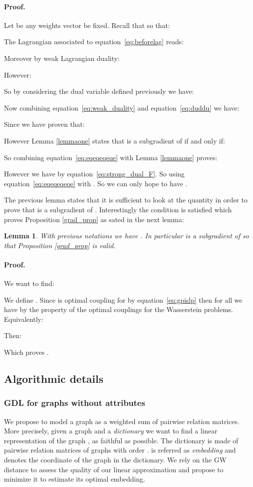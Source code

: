\documentclass{article}
\def\eqref#1{equation~\ref{#1}}
\newtheorem{lemma}{Lemma}
\begin{document}
	\paragraph{Proof.}
	Let  be any weights vector be fixed. Recall that  so that:
	
	The Lagrangian associated to \eqref{eq:beforelag} reads:
	
	Moreover by weak Lagrangian duality:
	
	However: 
	
	So by considering the dual variable  defined previously we have:
	
	Now combining \eqref{eq:weak_duality} and \eqref{eq:duddu} we have:
	
	Since  we have proven that:
	 
	However Lemma \ref{lemmaone} states that  is a subgradient of  if and only if:
	 
	So combining \eqref{eq:eqeqeqeqe} with Lemma \ref{lemmaone} proves:
	
	However we have  by \eqref{eq:strong_dual_F}. So  using \eqref{eq:eqeqeqeqe} with . So we can only hope to have . 
	
	
	The previous lemma states that it is sufficient to look at the quantity  in order to prove that  is a subgradient of . Interestingly the condition  is satisfied which proves Proposition \ref{grad_prop} as sated in the next lemma:
	\begin{lemma}
		With previous notations we have . In particular  is a subgradient of  so that Proposition \ref{grad_prop} is valid. 
	\end{lemma}
	
	\paragraph{Proof.}
	We want to find:
	
	We define . Since  is optimal coupling for  by \eqref{eq:gpislp} then for all  we have  by the property of the optimal couplings for the Wasserstein problems. Equivalently: 
	
	Then:
	
	Which proves .
	
	
	
	\subsection{Algorithmic details}
	\subsubsection{GDL for graphs without attributes} 
	We propose to model a graph as a weighted sum of pairwise relation
	matrices. More precisely, given a graph  and a \emph{dictionary}
	  we want to find a linear representation  of the graph , as faithful as
	possible. The dictionary is made of pairwise relation matrices of graphs with
	order .  is referred as
	\emph{embedding} and denotes the coordinate of the graph  in the dictionary. We rely
	on the GW distance to assess the quality of our linear
	approximation and propose to minimize it to estimate its optimal embedding. 
	
\end{document}
